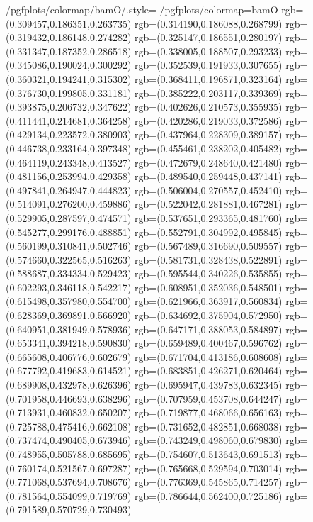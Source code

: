 {	/pgfplots/colormap/bamO/.style={
		/pgfplots/colormap={bamO}{%
			rgb=(0.309457,0.186351,0.263735)
			rgb=(0.314190,0.186088,0.268799)
			rgb=(0.319432,0.186148,0.274282)
			rgb=(0.325147,0.186551,0.280197)
			rgb=(0.331347,0.187352,0.286518)
			rgb=(0.338005,0.188507,0.293233)
			rgb=(0.345086,0.190024,0.300292)
			rgb=(0.352539,0.191933,0.307655)
			rgb=(0.360321,0.194241,0.315302)
			rgb=(0.368411,0.196871,0.323164)
			rgb=(0.376730,0.199805,0.331181)
			rgb=(0.385222,0.203117,0.339369)
			rgb=(0.393875,0.206732,0.347622)
			rgb=(0.402626,0.210573,0.355935)
			rgb=(0.411441,0.214681,0.364258)
			rgb=(0.420286,0.219033,0.372586)
			rgb=(0.429134,0.223572,0.380903)
			rgb=(0.437964,0.228309,0.389157)
			rgb=(0.446738,0.233164,0.397348)
			rgb=(0.455461,0.238202,0.405482)
			rgb=(0.464119,0.243348,0.413527)
			rgb=(0.472679,0.248640,0.421480)
			rgb=(0.481156,0.253994,0.429358)
			rgb=(0.489540,0.259448,0.437141)
			rgb=(0.497841,0.264947,0.444823)
			rgb=(0.506004,0.270557,0.452410)
			rgb=(0.514091,0.276200,0.459886)
			rgb=(0.522042,0.281881,0.467281)
			rgb=(0.529905,0.287597,0.474571)
			rgb=(0.537651,0.293365,0.481760)
			rgb=(0.545277,0.299176,0.488851)
			rgb=(0.552791,0.304992,0.495845)
			rgb=(0.560199,0.310841,0.502746)
			rgb=(0.567489,0.316690,0.509557)
			rgb=(0.574660,0.322565,0.516263)
			rgb=(0.581731,0.328438,0.522891)
			rgb=(0.588687,0.334334,0.529423)
			rgb=(0.595544,0.340226,0.535855)
			rgb=(0.602293,0.346118,0.542217)
			rgb=(0.608951,0.352036,0.548501)
			rgb=(0.615498,0.357980,0.554700)
			rgb=(0.621966,0.363917,0.560834)
			rgb=(0.628369,0.369891,0.566920)
			rgb=(0.634692,0.375904,0.572950)
			rgb=(0.640951,0.381949,0.578936)
			rgb=(0.647171,0.388053,0.584897)
			rgb=(0.653341,0.394218,0.590830)
			rgb=(0.659489,0.400467,0.596762)
			rgb=(0.665608,0.406776,0.602679)
			rgb=(0.671704,0.413186,0.608608)
			rgb=(0.677792,0.419683,0.614521)
			rgb=(0.683851,0.426271,0.620464)
			rgb=(0.689908,0.432978,0.626396)
			rgb=(0.695947,0.439783,0.632345)
			rgb=(0.701958,0.446693,0.638296)
			rgb=(0.707959,0.453708,0.644247)
			rgb=(0.713931,0.460832,0.650207)
			rgb=(0.719877,0.468066,0.656163)
			rgb=(0.725788,0.475416,0.662108)
			rgb=(0.731652,0.482851,0.668038)
			rgb=(0.737474,0.490405,0.673946)
			rgb=(0.743249,0.498060,0.679830)
			rgb=(0.748955,0.505788,0.685695)
			rgb=(0.754607,0.513643,0.691513)
			rgb=(0.760174,0.521567,0.697287)
			rgb=(0.765668,0.529594,0.703014)
			rgb=(0.771068,0.537694,0.708676)
			rgb=(0.776369,0.545865,0.714257)
			rgb=(0.781564,0.554099,0.719769)
			rgb=(0.786644,0.562400,0.725186)
			rgb=(0.791589,0.570729,0.730493)
}}}
